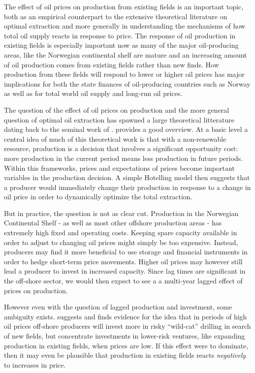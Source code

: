 \documentclass[12pt]{article}
\begin{document}
The effect of oil prices on production from existing fields is an important topic, both as an empirical counterpart to the extensive theoretical literature on optimal extraction and more generally in understanding the mechanisms of how total oil supply reacts in response to price.  The response of oil production in existing fields is especially important now as many of the major oil-producing areas, like the Norwegian continental shelf are mature and an increasing amount of oil production comes from existing fields rather than new finds.  How production from these fields will respond to lower or higher oil prices has major implications for both the state finances of oil-producing countries such as Norway as well as for total world oil supply and long-run oil prices.  

The question of the effect of oil prices on production and the more general question of optimal oil extraction has spawned a large theoretical litterature dating back to the seminal work of \citet{hotelling_economics_1931}. \citet{krautkraemer_nonrenewable_1998} provides a good overview. At a basic level a central idea of much of this theoretical work is that with a non-renewable resource, production is a decision that involves a significant opportunity cost: more production in the current period means less production in future periods.  Within this frameworks, prices and expectations of prices become important variables in the production decision. A simple Hotelling model then suggests that a producer would immediately change their production in response to a change in oil price in order to dynamically optimize the total extraction.

But in practice, the question is not as clear cut.  Production in the Norwegian Continental Shelf - as well as most other offshore production areas - has extremely high fixed and operating costs.  Keeping spare capacity available in order to adjust to changing oil prices might simply be too expensive.  Instead, producers may find it more beneficial to use storage and financial instruments in order to hedge short-term price movements. Higher oil prices may however still lead a producer to invest in increased capacity.  Since lag times are significant in the off-shore sector, we would then expect to see a a multi-year lagged effect of prices on production.  

However even with the question of lagged production and investment, some ambiguity exists.  \citet{mohn_efforts_2008} suggests and finds evidence for the idea that in periods of high oil prices off-shore producers will invest more in risky ``wild-cat'' drilling in search of new fields, but concentrate investments in lower-risk ventures, like expanding production in existing fields, when prices are low.  If this effect were to dominate, then it may even be plausible that production in existing fields reacts \emph{negatively} to increases in price.  
\end{document}
